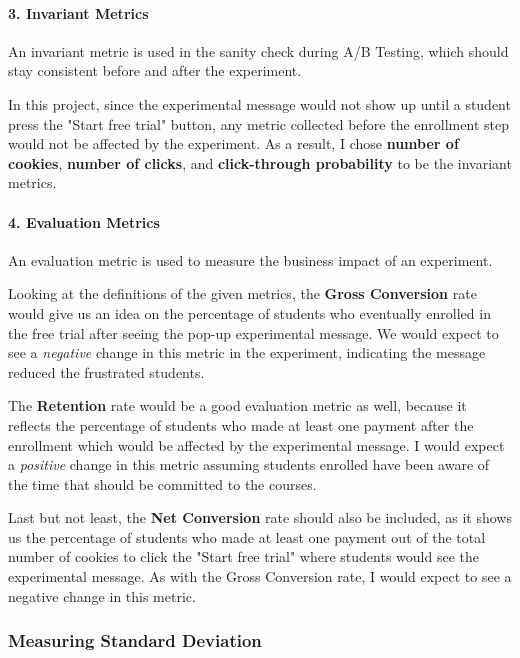 \documentclass[11pt]{article}
\begin{document}
    \paragraph{3. Invariant Metrics}\label{invariant-metrics}

An invariant metric is used in the sanity check during A/B Testing,
which should stay consistent before and after the experiment.

In this project, since the experimental message would not show up until
a student press the "Start free trial" button, any metric collected
before the enrollment step would not be affected by the experiment. As a
result, I chose \textbf{number of cookies}, \textbf{number of clicks},
and \textbf{click-through probability} to be the invariant metrics.

\paragraph{4. Evaluation Metrics}\label{evaluation-metrics}

An evaluation metric is used to measure the business impact of an
experiment.

Looking at the definitions of the given metrics, the \textbf{Gross
Conversion} rate would give us an idea on the percentage of students who
eventually enrolled in the free trial after seeing the pop-up
experimental message. We would expect to see a \emph{negative} change in
this metric in the experiment, indicating the message reduced the
frustrated students.

The \textbf{Retention} rate would be a good evaluation metric as well,
because it reflects the percentage of students who made at least one
payment after the enrollment which would be affected by the experimental
message. I would expect a \emph{positive} change in this metric assuming
students enrolled have been aware of the time that should be committed
to the courses.

Last but not least, the \textbf{Net Conversion} rate should also be
included, as it shows us the percentage of students who made at least
one payment out of the total number of cookies to click the "Start free
trial" where students would see the experimental message. As with the
Gross Conversion rate, I would expect to see a negative change in this
metric.

    \subsubsection{Measuring Standard
Deviation}\label{measuring-standard-deviation}
\end{document}
